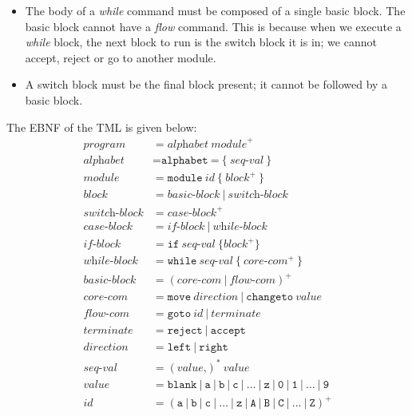 \begin{appendices}
\begin{itemize}
    \item The body of a \textit{while} command must be composed of a single basic block. The basic block cannot have a \textit{flow} command. This is because when we execute a \textit{while} block, the next block to run is the switch block it is in; we cannot accept, reject or go to another module.
    \item A switch block must be the final block present; it cannot be followed by a basic block.
\end{itemize}

The EBNF of the TML is given below:
\begin{align*}
    \textit{program} &= \textit{alphabet} \ \textit{module}^+ \\
    \textit{alphabet} &= \texttt{alphabet} \ \texttt{=} \ \texttt{\{} \ \textit{seq-val} \ \texttt{\}} \\
    \textit{module} &= \texttt{module} \ \textit{id} \ \texttt{\{} \ \textit{block}^+ \ \texttt{\}} \\
    \textit{block} &= \textit{basic-block} \ | \ \textit{switch-block} \\
    \textit{switch-block} &= \textit{case-block}^+ \\
    \textit{case-block} &= \textit{if-block} \ | \ \textit{while-block} \\
    \textit{if-block} &= \texttt{if} \ \textit{seq-val} \ \texttt{\{} \textit{block}^+ \texttt{\}} \\
    \textit{while-block} &= \texttt{while} \ \textit{seq-val} \ \texttt{\{} \ \textit{core-com}^+ \ \texttt{\}} \\
    \textit{basic-block} &= (\textit{core-com} \ | \ \textit{flow-com})^+ \\
    \textit{core-com} &= \texttt{move} \ \textit{direction} \ | \ \texttt{changeto} \ \textit{value} \\
    \textit{flow-com} &= \texttt{goto} \ \textit{id} \ | \ \textit{terminate} \\
    \textit{terminate} &= \texttt{reject} \ | \ \texttt{accept} \\
    \textit{direction} &= \texttt{left} \ | \ \texttt{right} \\
    \textit{seq-val} &= (\textit{value} \texttt{,})^* \ \textit{value} \\
    \textit{value} &= \texttt{blank} \ | \ \texttt{a} \ | \ \texttt{b} \ | \ \texttt{c} \ | \ \dots \ | \ \texttt{z} \ | \ \texttt{0} \ | \ \texttt{1} \ | \ \dots \ | \ \texttt{9} \\
    \textit{id} &= (\texttt{a} \ | \ \texttt{b} \ | \ \texttt{c} \ | \ \dots \ | \ \texttt{z} \ | \ \texttt{A} \ | \ \texttt{B} \ | \ \texttt{C} \ | \ \dots \ | \ \texttt{Z})^+
\end{align*}


\end{appendices}
